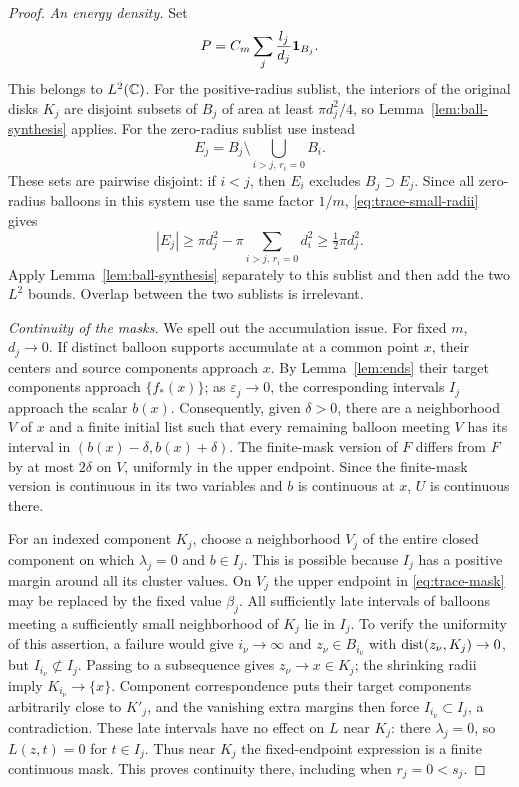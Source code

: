 \begin{proof}
\smallskip\noindent
\emph{An energy density.}
Set
\begin{equation}\label{eq:trace-density}
 P=C_m\sum_j\frac{l_j}{d_j}{\bf1}_{B_j}.
\end{equation}
This belongs to $L^2(\mathbb C)$.  For the positive-radius sublist, the
interiors of the original disks $K_j$ are disjoint subsets of $B_j$
of area at least $\pi d_j^2/4$, so Lemma~\ref{lem:ball-synthesis}
applies.  For the zero-radius sublist use instead
\[
 E_j=B_j\setminus\bigcup_{i>j,\,r_i=0}B_i.
\]
These sets are pairwise disjoint: if $i<j$, then $E_i$ excludes
$B_j\supset E_j$.  Since all zero-radius balloons in this system
use the same factor $1/m$, \eqref{eq:trace-small-radii} gives
\[
 |E_j|\geq\pi d_j^2-\pi\sum_{i>j,\,r_i=0}d_i^2
 \geq\tfrac12\pi d_j^2.
\]
Apply Lemma~\ref{lem:ball-synthesis} separately to this sublist and
then add the two $L^2$ bounds.  Overlap between the two sublists is
irrelevant.

\smallskip\noindent
\emph{Continuity of the masks.}
We spell out the accumulation issue.  For fixed $m$, $d_j\to0$.
If distinct balloon supports accumulate at a common point $x$, their
centers and source components approach $x$.  By Lemma~\ref{lem:ends}
their target components approach $\{f_*(x)\}$; as
$\varepsilon_j\to0$, the corresponding intervals $I_j$ approach
the scalar $b(x)$.  Consequently, given $\delta>0$, there are a
neighborhood $V$ of $x$ and a finite initial list such that every
remaining balloon meeting $V$ has its interval in
$(b(x)-\delta,b(x)+\delta)$.  The finite-mask version of $F$ differs
from $F$ by at most $2\delta$ on $V$, uniformly in the upper endpoint.
Since the finite-mask version is continuous in its two variables and
$b$ is continuous at $x$, $U$ is continuous there.

For an indexed component $K_j$, choose a neighborhood $V_j$ of the
entire closed component on which $\lambda_j=0$ and $b\in I_j$.
This is possible because $I_j$ has a positive margin around all its
cluster values.  On $V_j$ the upper endpoint in
\eqref{eq:trace-mask} may be replaced by the fixed value $\beta_j$.
All sufficiently late intervals of balloons meeting a sufficiently
small neighborhood of $K_j$ lie in $I_j$.  To verify the uniformity
of this assertion, a failure would give $i_\nu\to\infty$ and
$z_\nu\in B_{i_\nu}$ with $\operatorname{dist}(z_\nu,K_j)\to0$, but
$I_{i_\nu}\not\subset I_j$.  Passing to a subsequence gives
$z_\nu\to x\in K_j$; the shrinking radii imply
$K_{i_\nu}\to\{x\}$.  Component correspondence puts their target
components arbitrarily close to $K'_j$, and the vanishing extra
margins then force $I_{i_\nu}\subset I_j$, a contradiction.
These late intervals have no effect on $L$ near $K_j$: there
$\lambda_j=0$, so $L(z,t)=0$ for $t\in I_j$.  Thus near $K_j$ the fixed-endpoint expression
is a finite continuous mask.  This proves continuity there, including
when $r_j=0<s_j$.


\end{proof}
